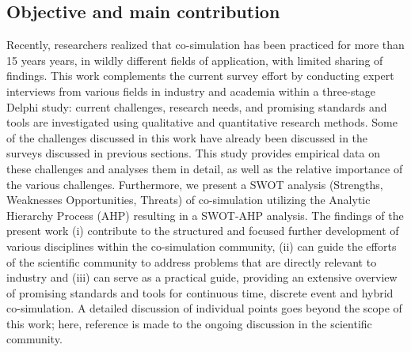 \subsection{Objective and main contribution}
Recently, researchers realized that co-simulation has been practiced for more than 15 years years, in wildly different fields of application, with limited sharing of findings.
This work complements the current survey effort by conducting expert interviews from various fields in industry and academia within a three-stage Delphi study: current challenges, research needs, and promising standards and tools are investigated using qualitative and quantitative research methods. 
Some of the challenges discussed in this work have already been discussed in the surveys discussed in previous sections. This study provides empirical data on these challenges and analyses them in detail, as well as the relative importance of the various challenges.
Furthermore, we present a SWOT analysis (Strengths, Weaknesses Opportunities, Threats) of co-simulation utilizing the Analytic Hierarchy Process (AHP) resulting in a SWOT-AHP analysis. 
The findings of the present work (i) contribute to the structured and focused further development of various disciplines within the co-simulation community, (ii) can guide the efforts of the scientific community to address problems that are directly relevant to industry and (iii) can serve as a practical guide, providing an extensive overview of promising standards and tools for continuous time, discrete event and hybrid co-simulation. 
A detailed discussion of individual points goes beyond the scope of this work; here, reference is made to the ongoing discussion in the scientific community.










